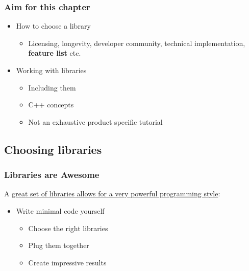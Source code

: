 \subsubsection{Aim for this chapter}\label{aim-for-this-chapter}

\begin{itemize}
\itemsep1pt\parskip0pt
\item
  How to choose a library

  \begin{itemize}
  \itemsep1pt\parskip0pt
  \item
    Licensing, longevity, developer community, technical implementation,
    \textbf{feature list} etc.
  \end{itemize}
\item
  Working with libraries

  \begin{itemize}
  \itemsep1pt\parskip0pt
  \item
    Including them
  \item
    C++ concepts
  \item
    Not an exhaustive product specific tutorial
  \end{itemize}
\end{itemize}

\subsection{Choosing libraries}\label{choosing-libraries}

\subsubsection{Libraries are Awesome}\label{libraries-are-awesome}

A
\href{http://github-pages.ucl.ac.uk/rsd-engineeringcourse/ch04packaging/01Libraries.html}{great
set of libraries allows for a very powerful programming style}:

\begin{itemize}
\itemsep1pt\parskip0pt
\item
  Write minimal code yourself

  \begin{itemize}
  \itemsep1pt\parskip0pt
  \item
    Choose the right libraries
  \item
    Plug them together
  \item
    Create impressive results
  \end{itemize}
\end{itemize}

